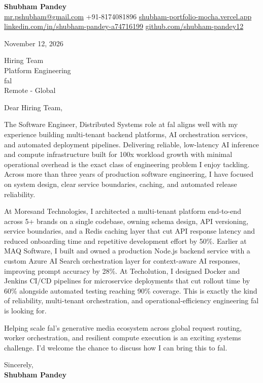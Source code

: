 \documentclass[a4paper,11pt]{article}
\begin{document}
\textbf{\Large Shubham Pandey}\\
\href{mailto:mr.pshubham@gmail.com}{mr.pshubham@gmail.com} \quad +91-8174081896 \quad
\href{https://shubham-portfolio-mocha.vercel.app/}{shubham-portfolio-mocha.vercel.app}\\
\href{https://www.linkedin.com/in/shubham-pandey-a74716199/}{linkedin.com/in/shubham-pandey-a74716199} \quad
\href{https://github.com/shubham-pandey12}{github.com/shubham-pandey12}

\vspace{1em}
November 12, 2026

\vspace{1em}
Hiring Team\\
Platform Engineering\\
fal\\
Remote - Global

\vspace{1em}
Dear Hiring Team,

The Software Engineer, Distributed Systems role at fal aligns well with my experience building multi-tenant backend platforms, AI orchestration services, and automated deployment pipelines. Delivering reliable, low-latency AI inference and compute infrastructure built for 100x workload growth with minimal operational overhead is the exact class of engineering problem I enjoy tackling. Across more than three years of production software engineering, I have focused on system design, clear service boundaries, caching, and automated release reliability.

At Moresand Technologies, I architected a multi-tenant platform end-to-end across 5+ brands on a single codebase, owning schema design, API versioning, service boundaries, and a Redis caching layer that cut API response latency and reduced onboarding time and repetitive development effort by 50\%. Earlier at MAQ Software, I built and owned a production Node.js backend service with a custom Azure AI Search orchestration layer for context-aware AI responses, improving prompt accuracy by 28\%. At Techolution, I designed Docker and Jenkins CI/CD pipelines for microservice deployments that cut rollout time by 60\% alongside automated testing reaching 90\% coverage. This is exactly the kind of reliability, multi-tenant orchestration, and operational-efficiency engineering fal is looking for.

Helping scale fal's generative media ecosystem across global request routing, worker orchestration, and resilient compute execution is an exciting systems challenge. I'd welcome the chance to discuss how I can bring this to fal.

\vspace{1em}
Sincerely,\\[0.5em]
\textbf{Shubham Pandey}
\end{document}
